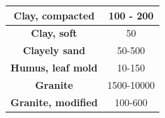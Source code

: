\documentclass[12pt,fleqn]{book} %
\begin{document}
\begin{enumerate}
\begin{table}[!h]
\begin{tabular}{!{\color[rgb]{0.557,0.667,0.859}\vrule}c!{\color{black}\vrule}c!{\color[rgb]{0.557,0.667,0.859}\vrule}}
\hline
{} \textbf{Clay, compacted}                                                                    & \textcolor[rgb]{0.322,0,0}{100} - 200\textcolor[rgb]{0.322,0,0}{}                                                                                                                                                                                                                                                      \\ 
\hline
\textbf{Clay, soft}                                                                                                           & \textcolor[rgb]{0.322,0,0}{50}                                                                                                                                                                                                                                                                                         \\ 
\hline
{} \textbf{\textcolor[rgb]{0.322,0,0}{Clayely} sand\textcolor[rgb]{0.322,0,0}{}}               & 50-500                                                                                                                                                                                                                                                                                                                 \\ 
\hline
\textcolor[rgb]{0.322,0,0}{\textbf{Humus, leaf mold}}                                                                         & 10-150                                                                                                                                                                                                                                                                                                                 \\ 
\hline
{} \textcolor[rgb]{0.322,0,0}{\textbf{Granite}}                                                & 1500-10000                                                                                                                                                                                                                                                                                                             \\ 
\hline
\textbf{\textcolor[rgb]{0.322,0,0}{Granite,} modified\textcolor[rgb]{0.322,0,0}{}}                                            & 100-600                                                                                                                                                                                                                                                                                                                \\ 

\end{tabular}
\end{table}
\end{enumerate}
\end{document}
